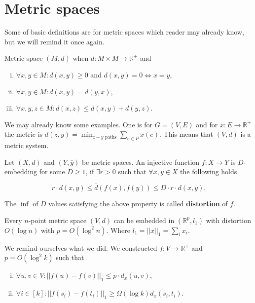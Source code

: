 \section{Metric spaces}

Some of basic definitions are for metric spaces which reader may already know, but we will remind it once again.

\begin{defn}
	Metric space $(M,d)$ when $d : M \times M \to \mathbb{R}^{+}$ and
	
	\begin{enumerate}[(i)]
		\item $\forall x,y \in M: d(x,y) \geq 0$ and $d(x,y) = 0 \Leftrightarrow x = y$,
		\item $\forall x,y \in M : d(x,y) = d(y,x)$,
		\item $\forall x,y,z \in M: d(x,z) \leq d(x,y) + d(y,z)$.
	\end{enumerate}
\end{defn}

We may already know some examples. One is for $G = (V,E)$ and for $x : E \to \mathbb{R}^{+}$ the metric is $d(z,y) = \min_{z-y \text{ paths}} \sum_{e \in P} x(e)$. This means that $(V,d)$ is a metric system.

\begin{defn}
	Let $(X,d)$ and $(Y,\bar{y})$ be metric spaces. An injective function $f : X \to Y$ is $D$-embedding for some $D \geq 1$, if $\exists r > 0$ such that $\forall x,y \in X$ the following holds
	
	$$
	r \cdot d(x,y) \leq \bar{d}(f(x), f(y)) \leq D \cdot r \cdot d(x,y).
	$$
\end{defn}

\begin{defn}
	The $\inf$ of $D$ values satisfying the above property is called \textbf{distortion} of $f$.
\end{defn}

\begin{thm}[Bourgain, 1985]
	Every $n$-point metric space $(V,d)$ can be embedded in $(\mathbb{R}^{p}, l_{1})$ with distortion $O(\log n)$ with $p = O(\log ^{2} n)$. Where $l_{1} = ||x||_{1} = \sum_{i}x_{i}$.
\end{thm}

We remind ourselves what we did. We constructed $f : V \to \mathbb{R}^{+}$ and $p = O(\log^{2} k)$ such that

\begin{enumerate}[(i)]
	\item $\forall u,v \in V : ||f(u) - f(v)||_{1} \leq p \cdot d_{x}(u,v)$,
	\item $\forall i \in [k] : ||f(s_{i}) - f(t_{i})||_{1} \geq \Omega(\log k) d_{x}(s_{i}, t_{i})$.
\end{enumerate}

